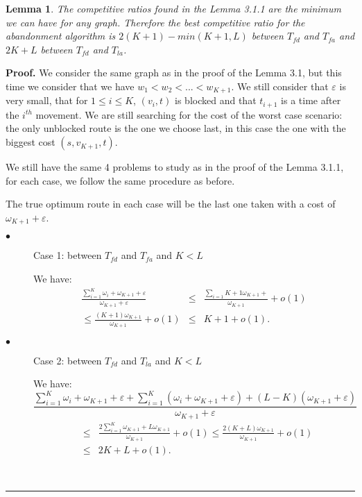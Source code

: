 \documentclass[a4paper, 10pt]{article}
\newtheorem{lemma}{Lemma}
\newenvironment{proof}[1][Proof]{\textbf{#1.} }{\ \rule{0.5em}{0.5em}}
\begin{document}
\begin{lemma} The competitive ratios found in the Lemma 3.1.1 are the minimum we can have for any graph. Therefore the best competitive ratio for the abandonment algorithm is $2(K+1) - min(K+1,L)$ between $T_{fd}$ and $T_{fa}$ and $2K+L$ between $T_{fd}$ and $T_{la}$.
\end{lemma}

\begin{proof} We consider the same graph as in the proof of the Lemma 3.1, but this time we consider that we have $w_1 < w_2 < ... < w_{K+1}$. We still consider that $\varepsilon$ is very small, that for $1\leq i \leq K$, $(v_i,t)$ is blocked and that $t_{i+1}$ is a time after the $i^{th}$ movement. We are still searching for the cost of the worst case scenario: the only unblocked route is the one we choose last, in this case the one with the biggest cost $(s,v_{K+1},t)$.


We still have the same 4 problems to study as in the proof of the Lemma 3.1.1, for each case, we follow the same procedure as before.

The true optimum route in each case will be the last one taken with a cost of $\omega_{K+1} + \varepsilon$.

\begin{description}
\item[$\bullet$] Case 1: between $T_{fd}$ and $T_{fa}$ and $K<L$

We have: 
\begin{eqnarray}
\frac {\sum_{i=1}^{K} \omega_{i} + \omega_{K+1} + \varepsilon} {\omega_{K+1} + \varepsilon} &\leq& \frac {\sum_{i=1}{K+1} \omega_{K+1} +} {\omega_{K+1}} + o(1)  \nonumber \\
\leq \frac {(K+1)\omega_{K+1} } {\omega_{K+1}} + o(1) &\leq& K+1 + o(1).\nonumber
\end{eqnarray}

\item[$\bullet$] Case 2: between $T_{fd}$ and $T_{la}$ and $K<L$

We have:
\[
\frac {\sum_{i=1}^{K} \omega_{i} +  \omega_{K+1} + \varepsilon + \sum_{i=1}^{K}(\omega_{i} + \omega_{K+1} + \varepsilon) + (L - K) ( \omega_{K+1} + \varepsilon )}{\omega_{K+1} + \varepsilon}
\]
\begin{eqnarray}
&\leq& \frac {2\sum_{i=1}^{K} \omega_{K+1} + L\omega_{K+1}}{\omega_{K+1}} + o(1) \leq \frac {2(K+L)\omega_{K+1}}{\omega_{K+1}} + o(1) \nonumber\\
 &\leq& 2K+ L + o(1).\nonumber
\end{eqnarray}


\end{description}
\end{proof}
\end{document}
